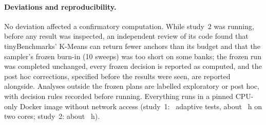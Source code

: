 \paragraph{Deviations and reproducibility.} No deviation affected a confirmatory
computation. While study~2 was running, before any result was inspected, an independent
review of its code found that tinyBenchmarks' K-Means can return fewer anchors than its
budget and that the sampler's frozen burn-in (10 sweeps) was too short on some banks; the
frozen run was completed unchanged, every frozen decision is reported as computed, and the
post hoc corrections, specified before the results were seen, are reported alongside.
Analyses outside the frozen plans are labelled exploratory or post hoc, with decision rules
recorded before running. Everything runs in a pinned CPU-only Docker image without network
access (study~1: \ConfirmRuns\ adaptive tests, about \ConfirmHours~h on two cores; study~2:
about \StudyTwoHours~h).
